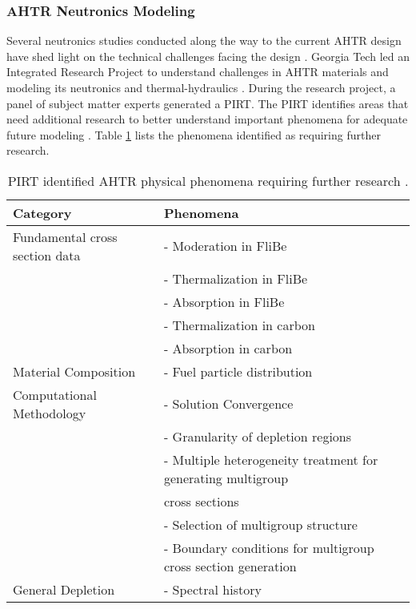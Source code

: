 \subsubsection{AHTR Neutronics Modeling}
Several neutronics studies conducted along the way to the current \gls{AHTR} 
design have shed light on the technical challenges facing the design 
\cite{ramey_monte_2018,holcomb_fluoride_2013,greene_pre-conceptual_2010}. 
\gls{Georgia Tech} led an Integrated Research Project to 
understand challenges in \gls{AHTR} materials and modeling its neutronics and 
thermal-hydraulics \cite{zhang_integrated_2019}. 
During the research project, a panel of subject matter experts 
generated a \gls{PIRT}.
The \gls{PIRT} identifies areas that need additional research to better 
understand important phenomena for adequate future modeling
\cite{rahnema_phenomena_2019}. 
Table \ref{tab:phenomena} lists the phenomena identified as requiring further 
research. 
\begin{table}[]
    \centering
    \onehalfspacing
    \caption{\acrlong{PIRT} identified \acrlong{AHTR} physical phenomena requiring 
    further research \cite{rahnema_phenomena_2019}.}
	\label{tab:phenomena}
    \footnotesize
    \begin{tabular}{l|l}
    \hline
    \textbf{Category} & \textbf{Phenomena} \\ \hline
    Fundamental cross section data & - Moderation in FliBe \\
    & - Thermalization in FliBe \\
    & - Absorption in FliBe \\
    & - Thermalization in carbon \\
    & - Absorption in carbon \\ \hline
    Material Composition & - Fuel particle distribution \\ \hline
    Computational Methodology & - Solution Convergence \\ 
    & - Granularity of depletion regions \\
    & - Multiple heterogeneity treatment for generating multigroup \\ 
    & cross sections \\
    & - Selection of multigroup structure \\
    & - Boundary conditions for multigroup cross section generation \\ \hline 
    General Depletion & - Spectral history \\ \hline 
    \end{tabular}
\end{table}

